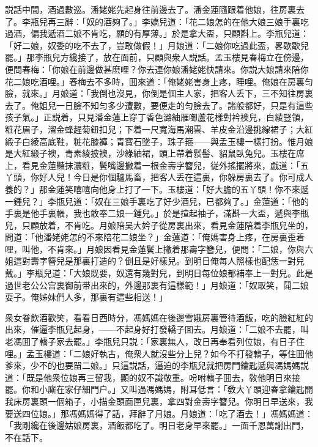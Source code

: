 説話中間，酒過數巡。潘姥姥先起身往前邊去了。潘金蓮隨跟着他娘，往房裏去了。李瓶兒再三辭：「奴的酒夠了。」李嬌兒道：「花二娘怎的在他大娘三娘手裏吃過酒，偏我遞酒二娘不肯吃，顯的有厚薄。」於是拿大盃，只顧斟上。李瓶兒道：「好二娘，奴委的吃不去了，豈敢做假！」月娘道：「二娘你吃過此盃，畧歇歇兒罷。」那李瓶兒方纔接了，放在面前，只顧與衆人説話。孟玉樓見春梅立在傍邊，便問春梅：「你娘在前邊做甚麽哩？你去連你娘潘姥姥快請來。你説大娘請來陪你花二娘吃酒哩。」春梅去不多時，囬來道：「俺姥姥害身上疼，睡哩。俺娘在房裏匀臉，就來。」月娘道：「我倒也沒見，你倒是個主人家，把客人丢下，三不知往房裏去了。俺姐兒一日臉不知匀多少遭數，要便走的匀臉去了。諸般都好，只是有這些孩子氣。」正説着，只見潘金蓮上穿丁香色潞紬雁啣蘆花樣對衿襖兒，白綾豎領，粧花眉子，溜金蜂趕菊鈕扣兒；下着一尺寬海馬潮雲、羊皮金沿邊挑線裙子；大紅緞子白綾高底鞋，粧花膝褲；青寳石墜子，珠子箍——與孟玉樓一樣打扮。惟月娘是大紅緞子襖，青素綾披襖，沙綠紬裙，頭上帶着䯼髻、貂鼠臥兔兒。玉樓在席上，看見金蓮豔抹濃粧，鬢嘴邊撇着一根金壽字簪兒，従外搖擺將來，戯道：「五丫頭，你好人兒！今日是你個驢馬畜，把客人丢在這裏，你躲房裏去了。你可成人養的？」那金蓮笑嘻嘻向他身上打了一下。玉樓道：「好大膽的五丫頭！你不來遞一鍾兒？」李瓶兒道：「奴在三娘手裏吃了好少酒兒，已都夠了。」金蓮道：「他的手裏是他手裏帳，我也敢奉二娘一鍾兒。」於是揎起袖子，滿斟一大盃，遞與李瓶兒，只顧放着，不肯吃。月娘陪吴大妗子從房裏出來，看見金蓮陪着李瓶兒坐的，問道：「他潘姥姥怎的不來陪花二娘坐？」金蓮道：「俺媽害身上疼，在房裏歪着哩，叫他，不肯來。」月娘因看見金蓮鬢上撇着那壽字簪兒，便問：「二娘，你與六姐這對壽字簪兒是那裏打造的？倒且是好樣兒。到明日俺每人照樣也配恁一對兒戴。」李瓶兒道：「大娘既要，奴還有幾對兒，到明日每位娘都補奉上一對兒。此是過世老公公宫裏御前带出來的，外邊那裏有這樣範！」月娘道：「奴取笑，鬦二娘耍子。俺姊妹們人多，那裏有這些相送！」

衆女眷飲酒歡笑，看看日西時分，馮媽媽在後邊雪娥房裏管待酒飯，吃的臉紅紅的出來，催逼李瓶兒起身，——不起身好打發轎子囬去。月娘道：「二娘不去罷，叫老馮囬了轎子家去罷。」李瓶兒只説：「家裏無人，改日再奉看列位娘，有日子住哩。」孟玉樓道：「二娘好執古，俺衆人就沒些分上兒？如今不打發轎子，等住囬他爹來，少不的也要㽞二娘。」只這説話，逼迫的李瓶兒就把房門鑰匙遞與馮媽媽説道：「既是他衆位娘再三留我，顯的奴不識敬重。吩咐轎子囬去，敎他明日來接罷。你和小廝在家仔細門户。」又叫過馮媽媽，附耳低言：「敎大丫頭迎春拿鑰匙開我床房裏頭一個箱子，小描金頭面匣兒裏，拿四對金壽字簪兒。你明日早送來，我要送四位娘。」那馮媽媽得了話，拜辭了月娘。月娘道：「吃了酒去！」馮媽媽道：「我剛纔在後邊姑娘房裏，酒飯都吃了。明日老身早來罷。」一面千恩萬謝出門，不在話下。

